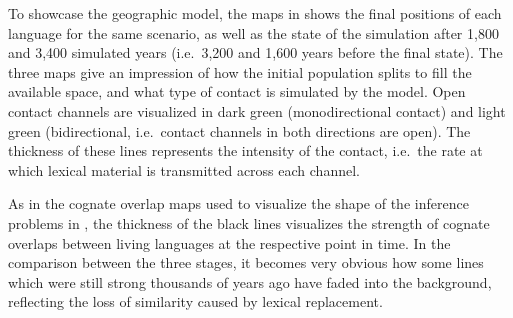 To showcase the geographic model, the maps in  shows the final positions of each language for the same scenario, as well as the state of the simulation after 1,800 and 3,400 simulated years (i.e.\ 3,200 and 1,600 years before the final state). The three maps give an impression of how the initial population splits to fill the available space, and what type of contact is simulated by the model. Open contact channels are visualized in dark green (monodirectional contact) and light green (bidirectional, i.e.\ contact channels in both directions are open). The thickness of these lines represents the intensity of the contact, i.e.\ the rate at which lexical material is transmitted across each channel.

As in the cognate overlap maps used to visualize the shape of the inference problems in , the thickness of the black lines visualizes the strength of cognate overlaps between living languages at the respective point in time. In the comparison between the three stages, it becomes very obvious how some lines which were still strong thousands of years ago have faded into the background, reflecting the loss of similarity caused by lexical replacement.

